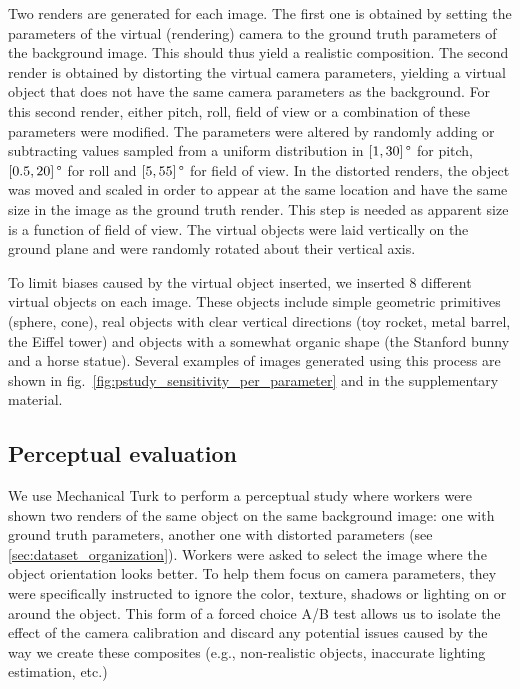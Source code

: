 Two renders are generated for each image. The first one is obtained by setting the parameters of the virtual (rendering) camera to the ground truth parameters of the background image. This should thus yield a realistic composition. The second render is obtained by distorting the virtual camera parameters, yielding a virtual object that does not have the same camera parameters as the background. For this second render, either pitch, roll, field of view or a combination of these parameters were modified. The parameters were altered by randomly adding or subtracting values sampled from a uniform distribution in $\left[ 1, 30 \right]\degree$ for pitch, $ \left[ 0.5, 20 \right]\degree$ for roll and $\left[ 5, 55\right]\degree$ for field of view. In the distorted renders, the object was moved and scaled in order to appear at the same location and have the same size in the image as the ground truth render. This step is needed as apparent size is a function of field of view. The virtual objects were laid vertically on the ground plane and were randomly rotated about their vertical axis.

To limit biases caused by the virtual object inserted, we inserted 8 different virtual objects on each image. These objects include simple geometric primitives (sphere, cone), real objects with clear vertical directions (toy rocket, metal barrel, the Eiffel tower) and objects with a somewhat organic shape (the Stanford bunny and a horse statue). Several examples of images generated using this process are shown in fig.~\ref{fig:pstudy_sensitivity_per_parameter} and in the supplementary material. 

\subsection{Perceptual evaluation}
\label{sec:hsa_perceptual_evaluation}

We use Mechanical Turk to perform a perceptual study where workers were shown two renders of the same object on the same background image: one with ground truth parameters, another one with distorted parameters (see \ref{sec:dataset_organization}). Workers were asked to select the image where the object orientation looks better. To help them focus on camera parameters, they were specifically instructed to ignore the color, texture, shadows or lighting on or around the object. This form of a forced choice A/B test allows us to isolate the effect of the camera calibration and discard any potential issues caused by the way we create these composites (e.g., non-realistic objects, inaccurate lighting estimation, etc.)

